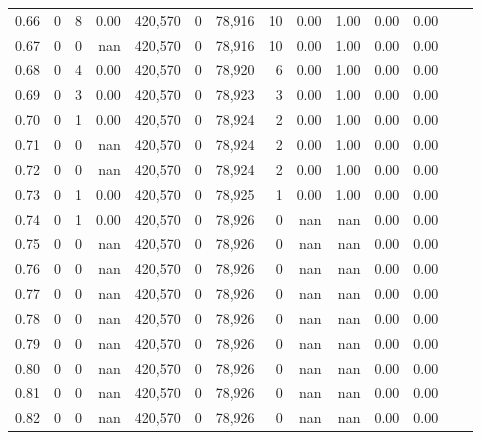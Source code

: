 \begin{tabular}{rrrrrrrrrrrrrr}
0.66 &       0 &      8 &    0.00 &  420,570 &        0 &  78,916 &      10 &  0.00 &  1.00 &  0.00 &      0.00 \\
0.67 &       0 &      0 &     nan &  420,570 &        0 &  78,916 &      10 &  0.00 &  1.00 &  0.00 &      0.00 \\
0.68 &       0 &      4 &    0.00 &  420,570 &        0 &  78,920 &       6 &  0.00 &  1.00 &  0.00 &      0.00 \\
0.69 &       0 &      3 &    0.00 &  420,570 &        0 &  78,923 &       3 &  0.00 &  1.00 &  0.00 &      0.00 \\
0.70 &       0 &      1 &    0.00 &  420,570 &        0 &  78,924 &       2 &  0.00 &  1.00 &  0.00 &      0.00 \\
0.71 &       0 &      0 &     nan &  420,570 &        0 &  78,924 &       2 &  0.00 &  1.00 &  0.00 &      0.00 \\
0.72 &       0 &      0 &     nan &  420,570 &        0 &  78,924 &       2 &  0.00 &  1.00 &  0.00 &      0.00 \\
0.73 &       0 &      1 &    0.00 &  420,570 &        0 &  78,925 &       1 &  0.00 &  1.00 &  0.00 &      0.00 \\
0.74 &       0 &      1 &    0.00 &  420,570 &        0 &  78,926 &       0 &   nan &   nan &  0.00 &      0.00 \\
0.75 &       0 &      0 &     nan &  420,570 &        0 &  78,926 &       0 &   nan &   nan &  0.00 &      0.00 \\
0.76 &       0 &      0 &     nan &  420,570 &        0 &  78,926 &       0 &   nan &   nan &  0.00 &      0.00 \\
0.77 &       0 &      0 &     nan &  420,570 &        0 &  78,926 &       0 &   nan &   nan &  0.00 &      0.00 \\
0.78 &       0 &      0 &     nan &  420,570 &        0 &  78,926 &       0 &   nan &   nan &  0.00 &      0.00 \\
0.79 &       0 &      0 &     nan &  420,570 &        0 &  78,926 &       0 &   nan &   nan &  0.00 &      0.00 \\
0.80 &       0 &      0 &     nan &  420,570 &        0 &  78,926 &       0 &   nan &   nan &  0.00 &      0.00 \\
0.81 &       0 &      0 &     nan &  420,570 &        0 &  78,926 &       0 &   nan &   nan &  0.00 &      0.00 \\
0.82 &       0 &      0 &     nan &  420,570 &        0 &  78,926 &       0 &   nan &   nan &  0.00 &      0.00 \\

\end{tabular}
